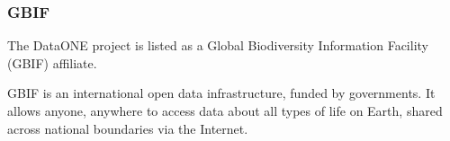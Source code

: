 




\subsubsection{GBIF}

The DataONE project is listed as a
Global Biodiversity Information Facility (GBIF)
affiliate.

GBIF is an international open data infrastructure, funded by governments.
It allows anyone, anywhere to access data about all types of life on Earth, shared across national boundaries via the Internet.



